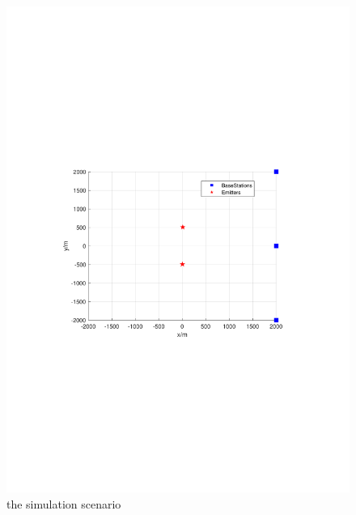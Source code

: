 \documentclass[review]{elsarticle}
\begin{document}
\begin{figure}[!t]
    \centerline{\includegraphics[width=1\textwidth]{pdfFigures/Senario.pdf}}
    \centering
	\caption{the simulation scenario}\label{fig3}
\end{figure}
\end{document}

